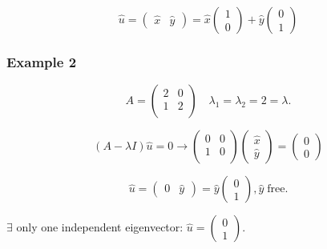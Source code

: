 \documentclass[12pt,twoside]{article}
\begin{document}
\begin{equation}
  \hat{u} =
  \begin{pmatrix}
    \hat{x} & \hat{y}
  \end{pmatrix} =
  \hat{x}
  \begin{pmatrix}
    1 \\ 0
  \end{pmatrix} +
  \hat{y}
  \begin{pmatrix}
    0 \\ 1
  \end{pmatrix}
\end{equation}

\subsubsection{Example 2}
\begin{equation}
  A =
  \begin{pmatrix}
    2 & 0 \\ 1 & 2 \\
  \end{pmatrix}
\quad \lambda_1 = \lambda_2 = 2 = \lambda.
\end{equation}

\begin{equation}
  (A-\lambda I)\hat{u}=0 \longrightarrow
  \begin{pmatrix}
    0 & 0 \\ 1 & 0 \\
  \end{pmatrix}
  \begin{pmatrix}
    \hat{x} \\ \hat{y}
  \end{pmatrix} =
  \begin{pmatrix}
    0 \\ 0
  \end{pmatrix}
\end{equation}

\begin{equation}
  \hat{u} =
  \begin{pmatrix}
    0 & \hat{y}
  \end{pmatrix} =
  \hat{y}
  \begin{pmatrix}
    0 \\ 1
  \end{pmatrix}, \hat{y}\;\text{free}.
\end{equation}

$\exists$ only one independent eigenvector: $\hat{u}=
\begin{pmatrix}
  0 \\ 1
\end{pmatrix}$.
\end{document}
